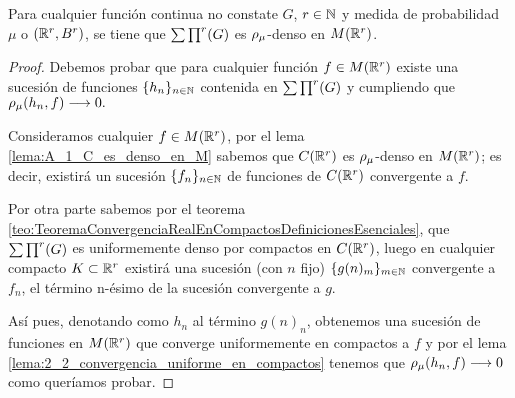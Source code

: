 %

\begin{teorema}\label{teo:2_2_denso_función_continua}
    Para cualquier función continua no constate $G$, $r \in \mathbb{N}$ y
    medida de probabilidad $\mu$ o $(\mathbb{R}^r, B^r)$, 
    se tiene que $\sum \prod^r (G)$ es $\rho_{\mu}$-denso en $M(\mathbb{R}^r)$. 
\end{teorema} 
\begin{proof}
    Debemos probar que para cualquier función $f \in M(\mathbb{R}^r)$ existe una 
    sucesión de funciones $\{h_n\}_{n\in \mathbb{N}}$ contenida en $\sum \prod^r (G)$ y 
    cumpliendo que $\rho_{\mu}(h_n, f) \longrightarrow 0.$

    Consideramos cualquier $f \in M(\mathbb{R}^r)$,
    por el lema \ref{lema:A_1_C_es_denso_en_M} sabemos que $C(\mathbb{R}^r)$ es $\rho_{\mu}$-denso en $M(\mathbb{R}^r)$; 
    es decir, existirá un sucesión $\{f_n\}_{n\in \mathbb{N}}$ de funciones de $C(\mathbb{R}^r)$ convergente a 
    $f$.  
    
    Por otra parte sabemos por el teorema \ref{teo:TeoremaConvergenciaRealEnCompactosDefinicionesEsenciales}, 
    que $\sum \prod^r (G)$ es uniformemente denso por compactos en $C(\mathbb{R}^r)$, luego en cualquier compacto 
    $K \subset \mathbb{R}^r$ existirá una sucesión (con $n$ fijo) $\{g(n)_m \} _{m \in \mathbb{N}}$ convergente 
    a $f_n$, el término n-ésimo de la sucesión convergente a $g$. 

    Así pues, denotando como $h_n$ al término $g(n)_n$, obtenemos una sucesión de funciones 
    en $M(\mathbb{R}^r)$ que converge uniformemente en compactos a $f$ y por el lema \ref{lema:2_2_convergencia_uniforme_en_compactos}
    tenemos que $\rho_{\mu}(h_n, f) \longrightarrow 0$ como queríamos probar.     
\end{proof}

